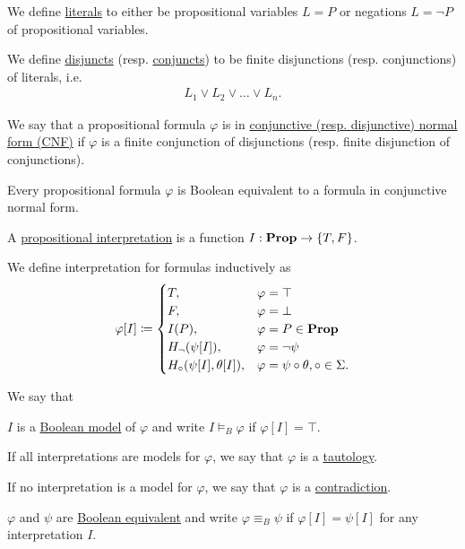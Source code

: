 \begin{definition}\label{def:conjunctive_normal_form}
  We define \ul{literals} to either be propositional variables $L = P$ or negations $L = \neg P$ of propositional variables.

  We define \ul{disjuncts} (resp. \ul{conjuncts}) to be finite disjunctions (resp. conjunctions) of literals, i.e.
  \begin{align*}
    L_1 \lor L_2 \lor \ldots \lor L_n.
  \end{align*}

  We say that a propositional formula $\varphi$ is in \ul{conjunctive (resp. disjunctive) normal form (CNF)} if $\varphi$ is a finite conjunction of disjunctions (resp. finite disjunction of conjunctions).
\end{definition}

\begin{proposition}\label{thm:conjunctive_normal_form_reduction}
  Every propositional formula $\varphi$ is Boolean equivalent to a formula in conjunctive normal form.
\end{proposition}

\begin{definition}\label{def:propositional_interpretation}
  A \ul{propositional interpretation} is a function $I: \operatorname{\mathbf{Prop}} \to \{ T, F \}$.

  We define interpretation for formulas inductively as
  \begin{align*}
    \varphi[I] \coloneqq \begin{cases}
      T,                           &\varphi = \top \\
      F,                           &\varphi = \bot \\
      I(P),                        &\varphi = P \in \operatorname{\mathbf{Prop}} \\
      H_\neg(\psi[I]),             &\varphi = \neg \psi         \\
      H_\circ(\psi[I], \theta[I]), &\varphi = \psi \circ \theta, \circ \in \Sigma.
    \end{cases}
  \end{align*}

  We say that
  \begin{defenum}
    \item\label{def:propositional_interpretation/model} $I$ is a \ul{Boolean model} of $\varphi$ and write $I \models_B \varphi$ if $\varphi[I] = \top$.
    \item\label{def:propositional_interpretation/tautology} If all interpretations are models for $\varphi$, we say that $\varphi$ is a \ul{tautology}.
    \item\label{def:propositional_interpretation/contradiction} If no interpretation is a model for $\varphi$, we say that $\varphi$ is a \ul{contradiction}.
    \item\label{def:propositional_interpretation/equivalence} $\varphi$ and $\psi$ are \ul{Boolean equivalent} and write $\varphi \equiv_B \psi$ if $\varphi[I] = \psi[I]$ for any interpretation $I$.
  \end{defenum}
\end{definition}

